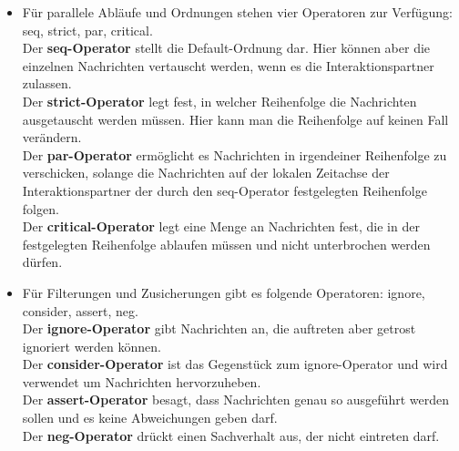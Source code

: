 \documentclass[a4paper, 12pt, margins=2.5cm]{homework}
\begin{document}
\begin{solution}
\begin{itemize}
      \item Für parallele Abläufe und Ordnungen stehen vier Operatoren zur Verfügung:
            seq, strict, par, critical. \\
            Der \textbf{seq-Operator} stellt die Default-Ordnung dar. Hier können
            aber die einzelnen Nachrichten vertauscht werden, wenn es die Interaktionspartner
            zulassen. \\
            Der \textbf{strict-Operator} legt fest, in welcher Reihenfolge die Nachrichten
            ausgetauscht werden müssen. Hier kann man die Reihenfolge auf keinen
            Fall verändern. \\
            Der \textbf{par-Operator} ermöglicht es Nachrichten in irgendeiner
            Reihenfolge zu verschicken, solange die Nachrichten auf der lokalen
            Zeitachse der Interaktionspartner der durch den seq-Operator festgelegten
            Reihenfolge folgen. \\
            Der \textbf{critical-Operator} legt eine Menge an Nachrichten fest,
            die in der festgelegten Reihenfolge ablaufen müssen und nicht unterbrochen
            werden dürfen. 

      \item Für Filterungen und Zusicherungen gibt es folgende Operatoren:
            ignore, consider, assert, neg. \\
            Der \textbf{ignore-Operator} gibt Nachrichten an, die auftreten
            aber getrost ignoriert werden können. \\
            Der \textbf{consider-Operator} ist das Gegenstück zum ignore-Operator
            und wird verwendet um Nachrichten hervorzuheben. \\
            Der \textbf{assert-Operator} besagt, dass Nachrichten genau so ausgeführt
            werden sollen und es keine Abweichungen geben darf. \\
            Der \textbf{neg-Operator} drückt einen Sachverhalt aus, der nicht 
            eintreten darf. 
    \end{itemize}
  \end{solution}

\newpage

  \begin{problem}
    
  \end{problem}
  \begin{solution}\hfill
    \begin{center}
      \def\svgwidth{1\textwidth}  
    \end{center}
  \end{solution}
\end{document}
